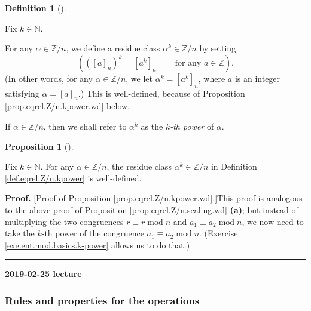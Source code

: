 \documentclass[numbers=enddot,12pt,final,onecolumn,notitlepage]{scrartcl}%
\numberwithin{exer}{subsection}
\theoremstyle{definition}
\newtheorem{prop}[theo]{Proposition}
\newenvironment{proposition}[1][]
{\begin{prop}[#1]\begin{leftbar}}
{\end{leftbar}\end{prop}}
\newtheorem{defi}[theo]{Definition}
\newenvironment{definition}[1][]
{\begin{defi}[#1]\begin{leftbar}}
{\end{leftbar}\end{defi}}
\newenvironment{proof}[1][Proof]{\noindent\textbf{#1.} }{\ \rule{0.5em}{0.5em}}
\begin{document}
\begin{definition}
\label{def.eqrel.Z/n.kpower}Fix $k\in\mathbb{N}$.

For any $\alpha\in\mathbb{Z}/n$, we define a residue class $\alpha^{k}%
\in\mathbb{Z}/n$ by setting
\[
\left(  \left(  \left[  a\right]  _{n}\right)  ^{k}=\left[  a^{k}\right]
_{n}\ \ \ \ \ \ \ \ \ \ \text{for any }a\in\mathbb{Z}\right)  .
\]
(In other words, for any $\alpha\in\mathbb{Z}/n$, we let $\alpha^{k}=\left[
a^{k}\right]  _{n}$, where $a$ is an integer satisfying $\alpha=\left[
a\right]  _{n}$.) This is well-defined, because of Proposition
\ref{prop.eqrel.Z/n.kpower.wd} below.

If $\alpha\in\mathbb{Z}/n$, then we shall refer to $\alpha^{k}$ as the
$k$\textit{-th power} of $\alpha$.
\end{definition}

\begin{proposition}
\label{prop.eqrel.Z/n.kpower.wd}Fix $k\in\mathbb{N}$. For any $\alpha
\in\mathbb{Z}/n$, the residue class $\alpha^{k}\in\mathbb{Z}/n$ in Definition
\ref{def.eqrel.Z/n.kpower} is well-defined.
\end{proposition}

\begin{proof}
[Proof of Proposition \ref{prop.eqrel.Z/n.kpower.wd}.]This proof is analogous
to the above proof of Proposition \ref{prop.eqrel.Z/n.scaling.wd}
\textbf{(a)}; but instead of multiplying the two congruences $r\equiv
r\operatorname{mod}n$ and $a_{1}\equiv a_{2}\operatorname{mod}n$, we now need
to take the $k$-th power of the congruence $a_{1}\equiv a_{2}%
\operatorname{mod}n$. (Exercise \ref{exe.ent.mod.basics.k-power} allows us to
do that.)
\end{proof}

\begin{center}
\textbf{2019-02-25 lecture}
\end{center}

\subsubsection{Rules and properties for the operations}
\end{document}
